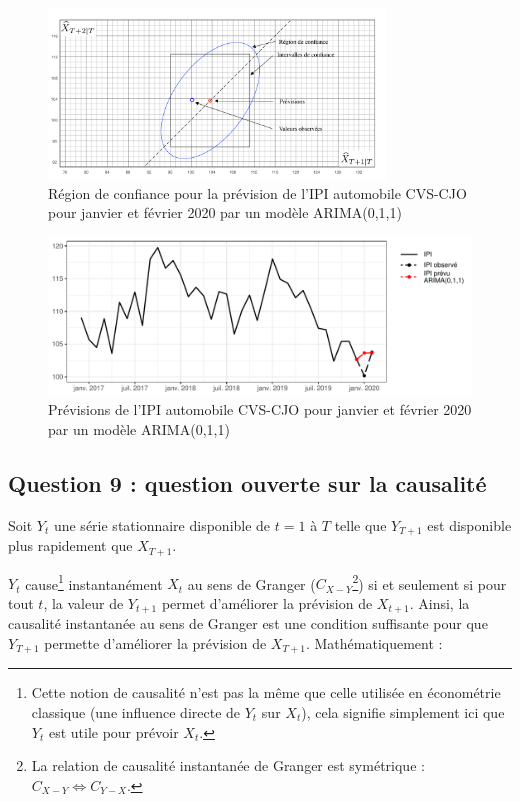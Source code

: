 \documentclass[,french]{article}
\let\rmarkdownfootnote\footnote%
\def\footnote{\protect\rmarkdownfootnote}
\begin{document}
\begin{figure}[htbp]
\begin{center}\includegraphics[width = 0.8\textwidth]{img/ellipse} \end{center}
\captionsetup{margin=0cm,format=hang,justification=justified}
\caption{Région de confiance pour la prévision de l'IPI automobile CVS-CJO pour janvier et février 2020 par un modèle ARIMA(0,1,1)}\label{fig:RegIC}
\end{figure}

\begin{figure}

{\centering \includegraphics{img/rmd-prevIpi-1} 

}

\caption{Prévisions de l'IPI automobile CVS-CJO pour janvier et février 2020 par un modèle ARIMA(0,1,1)}\label{fig:prevIpi}
\end{figure}

\hypertarget{question-9-question-ouverte-sur-la-causalituxe9}{%
\subsection{Question 9 : question ouverte sur la causalité}\label{question-9-question-ouverte-sur-la-causalituxe9}}

Soit \(Y_t\) une série stationnaire disponible de \(t = 1\) à \(T\) telle que \(Y_{T+1}\) est disponible plus rapidement que \(X_{T+1}\).

\(Y_t\) cause\footnote{Cette notion de causalité n'est pas la même que celle utilisée en économétrie classique (une influence directe de \(Y_t\) sur \(X_t\)), cela signifie simplement ici que \(Y_t\) est utile pour prévoir \(X_t\).} instantanément \(X_t\) au sens de Granger (\(C_{X - Y}\)\footnote{La relation de causalité instantanée de Granger est symétrique : \(C_{X - Y} \iff C_{Y - X}\).}) si et seulement si pour tout \(t\), la valeur de \(Y_{t+1}\) permet d'améliorer la prévision de \(X_{t+1}\).
Ainsi, la causalité instantanée au sens de Granger est une condition suffisante pour que \(Y_{T+1}\) permette d'améliorer la prévision de \(X_{T+1}\).
Mathématiquement :
\end{document}
